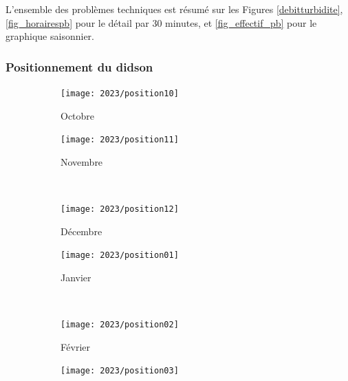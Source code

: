 \documentclass[11pt,twocolumn,titlepage,twoside]{article}
\begin{document}
L'ensemble des problèmes techniques est résumé sur les Figures
\ref{debitturbidite}, \ref{fig_horairespb} pour le détail par 30 minutes, et \ref{fig_effectif_pb} pour le graphique saisonnier.



\subsubsection{Positionnement du didson}


\begin{figure}[htbp]
        \centering
        \begin{subfigure}{0.2\textwidth}
                \centering
                \texttt{[image: 2023/position10]}
                \caption{Octobre}
                \label{position10}
       \end{subfigure}        
       \quad
        \begin{subfigure}{0.2\textwidth}
                \centering
                \texttt{[image: 2023/position11]}
                \caption{Novembre}
                \label{position11}
       \end{subfigure}        
       ~
        \begin{subfigure}{0.2\textwidth}
                \centering
                \texttt{[image: 2023/position12]}
                \caption{Décembre}
                \label{position12}
       \end{subfigure}        
       \quad
        \begin{subfigure}{0.2\textwidth}
                \centering
                \texttt{[image: 2023/position01]}
                \caption{Janvier}
                \label{position01}
       \end{subfigure}        
       ~
        \begin{subfigure}{0.2\textwidth}
                \centering
                \texttt{[image: 2023/position02]}
                \caption{Février}
                \label{position02}
       \end{subfigure}        
       \quad
        \begin{subfigure}{0.2\textwidth}
                \centering
                \texttt{[image: 2023/position03]}

\end{subfigure}
\end{figure}
\end{document}
